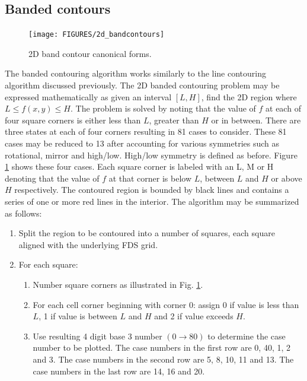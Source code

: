 \documentclass[11pt,twoside]{book}
\begin{document}
\subsection{Banded contours}
\begin{figure}[\figoptions]
\begin{center}
\texttt{[image: FIGURES/2d\_bandcontours]}
\end{center}
\caption{2D band contour canonical forms.
  }
\label{fig2dband}%
\end{figure}
The banded contouring algorithm works similarly to the line
contouring algorithm discussed previously.  The 2D banded
contouring problem may be expressed mathematically as given an
interval $[L,H]$, find the 2D region where $L\le f(x,y)\le H$. The
problem is solved by noting that the value of $f$ at each of four
square corners is either less than $L$, greater than $H$ or in
between.  There are three states at each of four corners resulting
in 81 cases to consider.  These 81 cases may be reduced to 13
after accounting for various symmetries such as rotational, mirror
and high/low. High/low symmetry is defined as before. Figure
\ref{fig2dband} shows these four cases.  Each square corner is
labeled with an L, M or H denoting that the value of $f$ at that
corner is below $L$, between $L$  and $H$ or above $H$
respectively.  The contoured region is bounded by black lines and
contains a series of one or more red lines in the interior. The
algorithm may be summarized as follows:
\begin{enumerate}
\item Split the region to be contoured into a number of squares,
each square aligned with the underlying FDS grid.

\item For  each square:
\begin{enumerate}
\item Number square corners as illustrated in Fig.
\ref{fig2dband}.

\item For each cell corner beginning with corner 0: assign 0 if
value is less than $L$, 1 if value is between $L$ and $H$ and 2 if
value exceeds $H$.

\item Use resulting 4 digit base 3 number $(0\rightarrow 80)$ to
determine the case number to be plotted. The case numbers in the
first row are 0, 40, 1, 2 and 3.  The case numbers in the second
row are 5, 8, 10, 11 and 13.  The case numbers in the last row are
14, 16 and 20.
\end{enumerate}
\end{enumerate}
\end{document}

